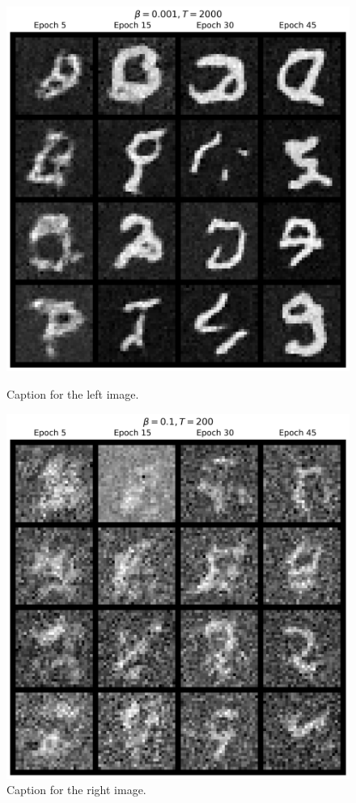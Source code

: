\documentclass[11pt]{article}
\begin{document}
\begin{figure}[H]
    \centering
    \begin{minipage}{0.48\textwidth}
        \includegraphics[width=\linewidth]{figs/q1b_good_uncond_samples.png}
        \caption{Caption for the left image.}
        \label{fig:left_img}
    \end{minipage}\hfill
    \begin{minipage}{0.48\textwidth}
        \includegraphics[width=\linewidth]{figs/q1b_bad_uncond_samples.png}
        \caption{Caption for the right image.}
        \label{fig:right_img}
    \end{minipage}
\end{figure}
\end{document}
